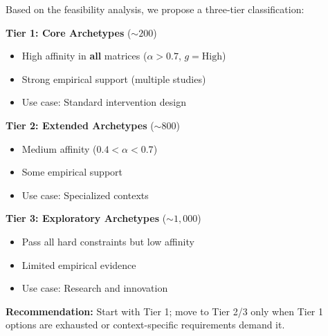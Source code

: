 \begin{tcolorbox}[colback=purple!5!white, colframe=purple!75!black,
    title=\textbf{Practical Application: Three-Tier Archetype Classification}]

Based on the feasibility analysis, we propose a three-tier classification:

\textbf{Tier 1: Core Archetypes} ($\sim 200$)
\begin{itemize}[nosep]
    \item High affinity in \textbf{all} matrices ($\alpha > 0.7$, $g = \text{High}$)
    \item Strong empirical support (multiple studies)
    \item Use case: Standard intervention design
\end{itemize}

\textbf{Tier 2: Extended Archetypes} ($\sim 800$)
\begin{itemize}[nosep]
    \item Medium affinity ($0.4 < \alpha < 0.7$)
    \item Some empirical support
    \item Use case: Specialized contexts
\end{itemize}

\textbf{Tier 3: Exploratory Archetypes} ($\sim 1{,}000$)
\begin{itemize}[nosep]
    \item Pass all hard constraints but low affinity
    \item Limited empirical evidence
    \item Use case: Research and innovation
\end{itemize}

\textbf{Recommendation:} Start with Tier 1; move to Tier 2/3 only when Tier 1 options are exhausted or context-specific requirements demand it.

\end{tcolorbox}

